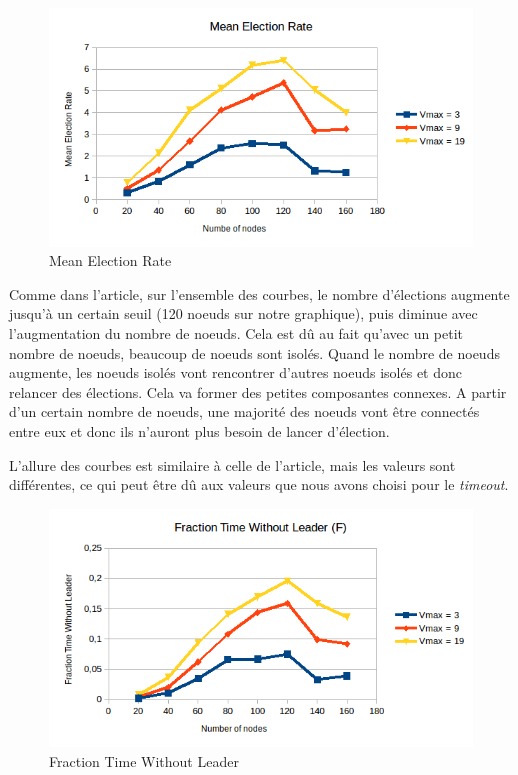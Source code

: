 \documentclass[paper=a4, fontsize=11pt]{article} %
\begin{document}
\newpage
\begin{figure}[!h]
\centering
\includegraphics[width=\textwidth]{mean_election_rate.png}
\caption{Mean Election Rate}
\label{MER}
\end{figure}
Comme dans l'article, sur l'ensemble des courbes, le nombre d'élections augmente jusqu'à un certain seuil (120 noeuds sur notre graphique), puis diminue avec l'augmentation du nombre de noeuds. Cela est dû au fait qu'avec un petit nombre de noeuds, beaucoup de noeuds sont isolés. Quand le nombre de noeuds augmente, les noeuds isolés vont rencontrer d'autres noeuds isolés et donc relancer des élections. Cela va former des petites composantes connexes. A partir d'un certain nombre de noeuds, une majorité des noeuds vont être connectés entre eux et donc ils n'auront plus besoin de lancer d'élection.

L'allure des courbes est similaire à celle de l'article, mais les valeurs sont différentes, ce qui peut être dû aux valeurs que nous avons choisi pour le \textit{timeout}.


\newpage
\begin{figure}[!h]
\centering
\includegraphics[width=\textwidth]{fraction_time_without_leader.png}
\caption{Fraction Time Without Leader}
\label{FTWT}
\end{figure}
\end{document}
